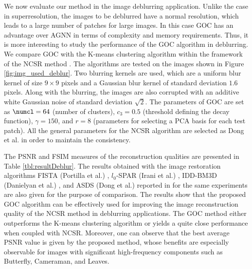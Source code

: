 \documentclass[journal]{IEEEtran}
\begin{document}
We now evaluate our method in the image deblurring application. Unlike the case in superresolution, the images to be deblurred have a normal resolution, which leads to a large number of patches for large images. In this case GOC has an advantage over AGNN in terms of complexity and memory requirements. Thus, it is more interesting to study the performance of the GOC algorithm in deblurring.  We compare GOC with the K-means clustering algorithm within the framework of the NCSR method \cite{Dong13nonlocally}. The algorithms are tested on the images shown in Figure \ref{fig:img_used_deblur}. Two blurring kernels are used, which are a uniform blur kernel of size $9\times 9$ pixels and a Gaussian blur kernel of standard deviation  $1.6$ pixels. Along with the blurring, the images are also corrupted with an additive white Gaussian noise of standard deviation $\sqrt{2}$. The parameters of GOC are set as $\numcl=64$ (number of clusters), $c_3 = 0.5$ (threshold defining the decay function), $\gamma=150$, and $r=8$ (parameters for selecting a PCA basis for each test patch). All the general parameters for the NCSR algorithm are selected as Dong et al. \cite{Dong13nonlocally} in order to maintain the consistency.


The PSNR and FSIM \cite{LinZhang11fsim} measures of the reconstruction qualities are presented in Table \ref{tbl:resultDeblur}. The results obtained with the image restoration algorithms FISTA (Portilla et al.) \cite{Portilla09image}, $l_0$-SPAR (Irani et al.) \cite{Irani93motion}, IDD-BM3D (Danielyan et al.) \cite{Danielyan12bm3d}, and ASDS (Dong et al.) \cite{Dong11image} reported in \cite{Dong13nonlocally} for the same experiments are also given for the purpose of comparison. The results show that the proposed GOC algorithm can be effectively used for improving the image reconstruction quality of the NCSR method in deblurring applications. The GOC method either outperforms the K-means clustering algorithm or yields a quite close performance when coupled with NCSR. Moreover, one can observe that the best average PSNR value is given by the proposed method, whose benefits are especially observable for images with significant high-frequency components such as Butterfly, Cameraman, and Leaves.
\end{document}

